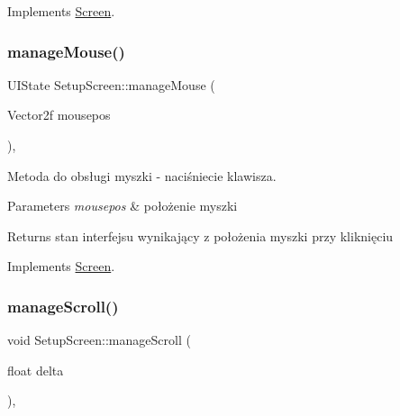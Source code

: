 Implements \mbox{\hyperlink{class_screen_a5b385381d2ba942567f4317e916c9951}{Screen}}.

\mbox{\label{class_setup_screen_a0057c82efae24568d4867558fa66167d}} 
\subsubsection{\texorpdfstring{manageMouse()}{manageMouse()}}
{\footnotesize\ttfamily U\+I\+State Setup\+Screen\+::manage\+Mouse (\begin{DoxyParamCaption}\item[{Vector2f}]{mousepos }\end{DoxyParamCaption})\hspace{0.3cm}{\ttfamily [override]}, {\ttfamily [virtual]}}



Metoda do obsługi myszki -\/ naciśniecie klawisza. 


\begin{DoxyParams}{Parameters}
{\em mousepos} & położenie myszki \\
\hline
\end{DoxyParams}
\begin{DoxyReturn}{Returns}
stan interfejsu wynikający z położenia myszki przy kliknięciu 
\end{DoxyReturn}


Implements \mbox{\hyperlink{class_screen_aee89e0a473a855ddd0ae9cd38c5f2529}{Screen}}.

\mbox{\label{class_setup_screen_af1374ba49c48b6b4a832b54422851e5d}} 
\subsubsection{\texorpdfstring{manageScroll()}{manageScroll()}}
{\footnotesize\ttfamily void Setup\+Screen\+::manage\+Scroll (\begin{DoxyParamCaption}\item[{float}]{delta }\end{DoxyParamCaption})\hspace{0.3cm}{\ttfamily [inline]}, {\ttfamily [virtual]}}



